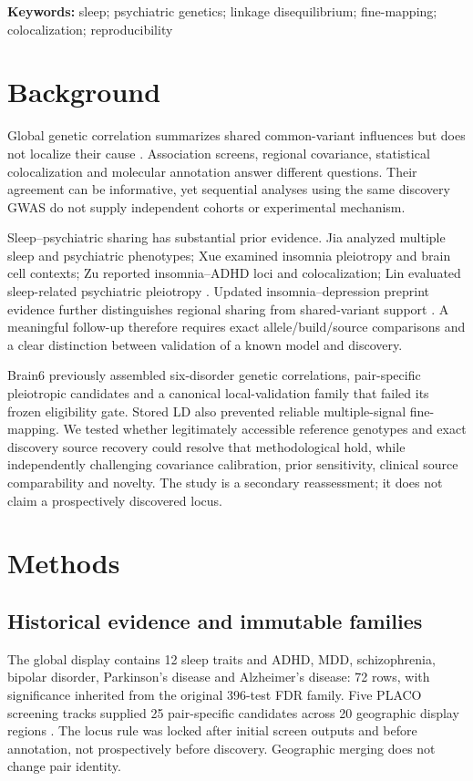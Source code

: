 \documentclass[11pt]{article}
\begin{document}
\textbf{Keywords:} sleep; psychiatric genetics; linkage disequilibrium; fine-mapping; colocalization; reproducibility

\section*{Background}
Global genetic correlation summarizes shared common-variant influences but does not localize their cause \cite{ldsc,lava}. Association screens, regional covariance, statistical colocalization and molecular annotation answer different questions. Their agreement can be informative, yet sequential analyses using the same discovery GWAS do not supply independent cohorts or experimental mechanism.

Sleep--psychiatric sharing has substantial prior evidence. Jia analyzed multiple sleep and psychiatric phenotypes; Xue examined insomnia pleiotropy and brain cell contexts; Zu reported insomnia--ADHD loci and colocalization; Lin evaluated sleep-related psychiatric pleiotropy \cite{jia,xue,zu,lin}. Updated insomnia--depression preprint evidence further distinguishes regional sharing from shared-variant support \cite{schipper}. A meaningful follow-up therefore requires exact allele/build/source comparisons and a clear distinction between validation of a known model and discovery.

Brain6 previously assembled six-disorder genetic correlations, pair-specific pleiotropic candidates and a canonical local-validation family that failed its frozen eligibility gate. Stored LD also prevented reliable multiple-signal fine-mapping. We tested whether legitimately accessible reference genotypes and exact discovery source recovery could resolve that methodological hold, while independently challenging covariance calibration, prior sensitivity, clinical source comparability and novelty. The study is a secondary reassessment; it does not claim a prospectively discovered locus.

\section*{Methods}
\subsection*{Historical evidence and immutable families}
The global display contains 12 sleep traits and ADHD, MDD, schizophrenia, bipolar disorder, Parkinson's disease and Alzheimer's disease: 72 rows, with significance inherited from the original 396-test FDR family. Five PLACO screening tracks supplied 25 pair-specific candidates across 20 geographic display regions \cite{placo}. The locus rule was locked after initial screen outputs and before annotation, not prospectively before discovery. Geographic merging does not change pair identity.
\end{document}
